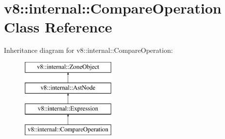 \hypertarget{classv8_1_1internal_1_1CompareOperation}{}\section{v8\+:\+:internal\+:\+:Compare\+Operation Class Reference}
\label{classv8_1_1internal_1_1CompareOperation}
Inheritance diagram for v8\+:\+:internal\+:\+:Compare\+Operation\+:\begin{figure}[H]
\begin{center}
\leavevmode
\includegraphics[height=4.000000cm]{classv8_1_1internal_1_1CompareOperation}
\end{center}
\end{figure}
